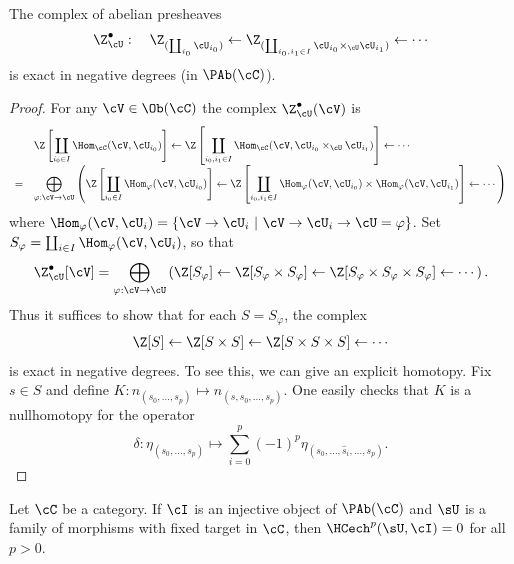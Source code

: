  \begin{lem}
 The complex of abelian presheaves
 \begin{align*}
 \Z_{\cU}^\bullet :  \quad \Z_{(\coprod_{i_0} \cU_{i_0})} \leftarrow \Z_{(\coprod_{i_0, i_1\in I} \cU_{i_0}\times_\cU \cU_{i_1})}\leftarrow \cdots 
 \end{align*}
 is exact in negative degrees (in $\PAb(\cC)$).
  \end{lem}
  
\begin{proof}
For any $\cV\in \Ob(\cC)$ the complex $\Z_{\cU}^\bullet(\cV)$ is
$$
\begin{array}{cl}
&
\displaystyle
\Z\left[\coprod_{i_0\in I} \Hom_{\cC}(\cV, \cU_{i_0}) \right]\leftarrow \Z\left[\coprod_{i_0, i_1 \in I}\Hom_{\cC}(\cV, \cU_{i_0}\times_\cU \cU_{i_1})\right]\leftarrow \cdots\\ 
 = &
 \displaystyle \bigoplus_{\varphi: \cV \to \cU} \left( \Z\left[\coprod_{i_0 \in I}\Hom_\varphi(\cV,  \cU_{i_0})\right]\leftarrow \Z\left[\coprod_{i_0, i_1\in I} \Hom_{\varphi}(\cV, \cU_{i_0})\times \Hom_{\varphi}(\cV, \cU_{i_1})\right]\leftarrow \cdots\right) 
\end{array}
$$
where 
$\Hom_{\varphi}(\cV, \cU_i)= \{\cV\to \cU_i \ | \ \cV\to \cU_i \to \cU = \varphi \}$. Set $S_\varphi=\coprod_{i\in I} \Hom_{\varphi}(\cV, \cU_i)$, so that 
$$
\Z_\cU^\bullet [\cV] = \bigoplus_{\varphi: \cV \to \cU} \left( \Z[S_\varphi] \leftarrow \Z[S_\varphi\times S_\varphi] \leftarrow \Z[S_\varphi\times S_\varphi\times S_\varphi] \leftarrow\cdots \right).
$$
Thus it suffices to show that for each $S = S_\varphi$, the complex  
\begin{align*}
\Z[S] \leftarrow \Z[S\times S] \leftarrow \Z[S\times S\times S] \leftarrow\cdots
\end{align*}
is exact in negative degrees.  To see this, we can give an explicit homotopy. Fix $s\in S$ and define $K:    n_{(s_0, \ldots, s_p)} \mapsto n_{(s, s_0, \ldots, s_p)}.$ One easily checks that $K$ is a nullhomotopy for the operator
    $$\delta: \eta_{(s_0,\ldots,s_p)} \mapsto 
    \sum_{i=0}^p (-1)^p \eta_{(s_0,\ldots, \hat s_i,\ldots, s_p)}.$$
  \end{proof}
  
  \begin{lem} \label{lem:HomInjSheafIsExact}
 Let $\cC$ be a category. If $\cI$ is an injective object of $\PAb(\cC)$ and $\sU$ is a family of morphisms with fixed target in $\cC$, then $\HCech^p(\sU, \cI) = 0$ for all $p>0$. 
  \end{lem}
  

